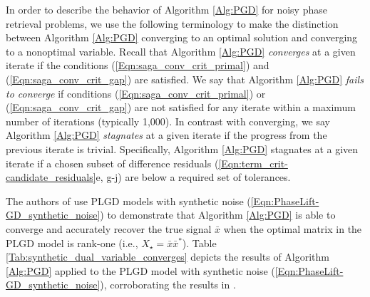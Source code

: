 In order to describe the behavior of Algorithm \ref{Alg:PGD} for noisy phase retrieval problems, we use the following terminology to make the distinction between Algorithm \ref{Alg:PGD} converging to an optimal solution and converging to a nonoptimal variable.
Recall that Algorithm \ref{Alg:PGD} \textit{converges} at a given iterate if the conditions (\ref{Eqn:saga_conv_crit_primal}) and (\ref{Eqn:saga_conv_crit_gap}) are satisfied.  
We say that Algorithm \ref{Alg:PGD} \textit{fails to converge} if conditions (\ref{Eqn:saga_conv_crit_primal}) or (\ref{Eqn:saga_conv_crit_gap}) are not satisfied for any iterate within a maximum number of iterations (typically 1,000).
In contrast with converging, we say Algorithm \ref{Alg:PGD} \textit{stagnates} at a given iterate if the progress from the previous iterate is trivial.  
Specifically, Algorithm \ref{Alg:PGD} stagnates at a given iterate if a chosen subset of difference residuals (\ref{Eqn:term_crit-candidate_residuals}e, g-j) are below a required set of tolerances.











The authors of \cite{DBLP:journals/siamsc/FriedlanderM16} use PLGD models with synthetic noise (\ref{Eqn:PhaseLift-GD_synthetic_noise}) to demonstrate that Algorithm \ref{Alg:PGD} is able to converge and accurately recover the true signal $\bar{x}$ when the optimal matrix in the PLGD model is rank-one (i.e., $X_\star = \bar{x} \bar{x}^*$).  
Table \ref{Tab:synthetic_dual_variable_converges} depicts the results of Algorithm \ref{Alg:PGD} applied to the PLGD model with synthetic noise (\ref{Eqn:PhaseLift-GD_synthetic_noise}), corroborating the results in \cite[Section 5.1.2]{DBLP:journals/siamsc/FriedlanderM16}.

